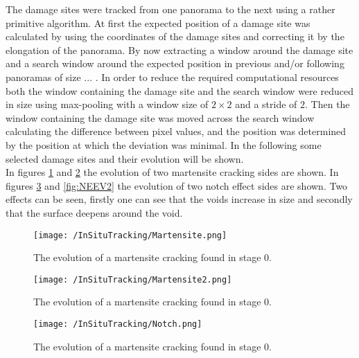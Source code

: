 The damage sites were tracked from one panorama to the next using a rather primitive algorithm. At first the expected position of a damage site was calculated by using the coordinates of the damage sites and correcting it by the elongation of the panorama. By now extracting a window around the damage site and a search window around the expected position in previous and/or following panoramas of size ... . In order to reduce the required computational resources both the window containing the damage site and the search window were reduced in size using max-pooling with a window size of $2\times 2$ and a stride of $2$. Then the window containing the damage site was moved across the search window calculating the difference between pixel values, and the position was determined by the position at which the deviation was minimal. In the following some selected damage sites and their evolution will be shown. \\

In figures \ref{fig:MCEV1} and \ref{fig:MCEV2} the evolution of two martensite cracking sides are shown. In figures \ref{fig:NEEV1} and \ref{fig:NEEV2} the evolution of two notch effect sides are shown. Two effects can be seen, firstly one can see that the voids increase in size and secondly that the surface deepens around the void. \\

\begin{figure}
\texttt{[image: /InSituTracking/Martensite.png]}
\caption{The evolution of a martensite cracking found in stage 0.}
\label{fig:MCEV1}
\end{figure}

\begin{figure}
\texttt{[image: /InSituTracking/Martensite2.png]}
\caption{The evolution of a martensite cracking found in stage 0.}
\label{fig:MCEV2}
\end{figure}



\begin{figure}
\texttt{[image: /InSituTracking/Notch.png]}
\caption{The evolution of a martensite cracking found in stage 0.}
\label{fig:NEEV1}
\end{figure}

